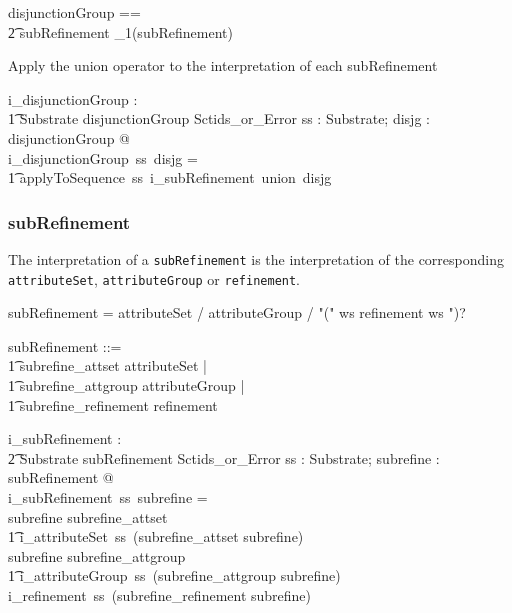 \documentclass{article}
\def\spec#1{{\tt #1}}
\def\bnf#1{{\scriptsize {{#1}} }}
\begin{document}
\begin{zed}
disjunctionGroup == \\
\t2 subRefinement \cross \seq_1(subRefinement)
\end{zed}

Apply the union operator to the interpretation of each  subRefinement

\begin{gendef}
    i\_disjunctionGroup : \\
\t1 Substrate \fun disjunctionGroup \fun Sctids\_or\_Error
\where
   \forall ss : Substrate;  disjg : disjunctionGroup @ \\
i\_disjunctionGroup~ss~disjg = \\
\t1 applyToSequence~ss~i\_subRefinement~union~disjg
\end{gendef}

\subsubsection{subRefinement}
The interpretation of a \spec{subRefinement} is the interpretation of the corresponding \spec{attributeSet}, \spec{attributeGroup} or \spec{refinement}.

\begin{framed}
\noindent
\bnf{subRefinement = attributeSet / attributeGroup / "(" ws refinement ws ")?}
\end{framed}

\begin{zed}
subRefinement ::= \\
\t1 subrefine\_attset \ldata attributeSet \rdata | \\
\t1 subrefine\_attgroup \ldata attributeGroup \rdata | \\
\t1 subrefine\_refinement \ldata refinement \rdata
\end{zed}


\begin{gendef}
   i\_subRefinement : \\
\t2 Substrate \fun subRefinement \fun Sctids\_or\_Error
\where
   \forall ss : Substrate; subrefine : subRefinement @ \\
   i\_subRefinement~ss~subrefine = \\
   \IF subrefine \in \ran subrefine\_attset \\
\t1 \THEN i\_attributeSet~ss~(subrefine\_attset \inv subrefine) \\
   \ELSE \IF subrefine \in \ran subrefine\_attgroup \\
\t1 \THEN i\_attributeGroup~ss~(subrefine\_attgroup \inv subrefine) \\
  \ELSE i\_refinement~ss~(subrefine\_refinement \inv subrefine)
\end{gendef}
\end{document}
